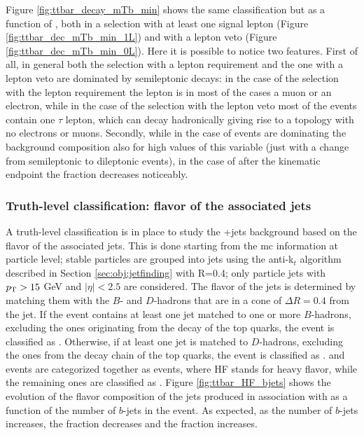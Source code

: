 Figure \ref{fig:ttbar_decay_mTb_min} shows the same \ttbar classification but as a function of \mtb, both in a selection with at least one signal lepton (Figure \ref{fig:ttbar_dec_mTb_min_1L}) and with a lepton veto (Figure \ref{fig:ttbar_dec_mTb_min_0L}). Here it is possible to notice two features. First of all, in general both the selection with a lepton requirement and the one with a lepton veto are dominated by semileptonic decays: in the case of the selection with the lepton requirement the lepton is in most of the cases a muon or an electron, while in the case of the selection with the lepton veto most of the events contain one $\tau$ lepton, which can decay hadronically giving rise to a topology with no electrons or muons.
Secondly, while in the case of \mt \ttbar events are dominating the background composition also for high values of this variable (just with a change from semileptonic to dileptonic \ttbar events), in the case of \mtb after the kinematic endpoint the \ttbar fraction decreases noticeably. 




\subsubsection*{Truth-level classification: flavor of the associated jets}

A truth-level classification is in place to study the \ttbar+jets background based on the flavor of the associated jets.
This is done starting from the \gls{mc} information at particle level; stable particles are grouped into jets using the anti-k$_t$ algorithm 
described in Section \ref{sec:obj:jetfinding} with R=0.4; only particle jets with $p_{\rm T} > 15$ GeV and $|\eta|<2.5$ are considered. 
The flavor of the jets is determined by matching them with the $B$- and $D$-hadrons that are in a cone of $\Delta R = 0.4$ from the jet. 
If the event contains at least one jet matched to one or more $B$-hadrons, excluding the ones originating from the decay of the top quarks, the event 
is classified as \ttbb. Otherwise, if at least one jet is matched to $D$-hadrons, excluding the ones from the decay chain of the top quarks, the event is classified as \ttcc. \ttbb and \ttcc events are categorized together as \tthf events, where HF stands for heavy flavor, while the remaining ones are classified as \ttlight.
Figure \ref{fig:ttbar_HF_bjets} shows the evolution of the flavor composition of the jets produced in association with \ttbar
as a function of the number of $b$-jets in the event. 
As expected, as the number of $b$-jets increases, the \ttlight fraction decreases and the \ttbb fraction increases. 

